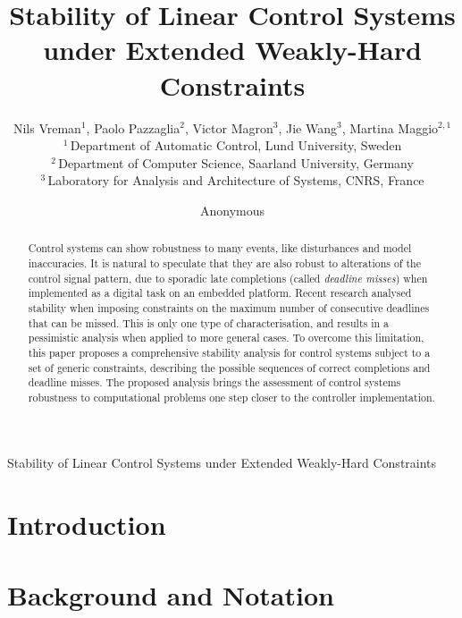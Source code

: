 \documentclass[lettersize,journal]{IEEEtran}
\begin{document}
\title{Stability of Linear Control Systems under Extended Weakly-Hard Constraints}

\author{Nils Vreman$^{1}$, Paolo Pazzaglia$^{2}$, Victor Magron$^{3}$, Jie Wang$^{3}$, Martina Maggio$^{2,1}$\\
$^{1}\,$Department of Automatic Control, Lund University, Sweden\\
$^{2}\,$Department of Computer Science, Saarland University, Germany\\
$^{3}\,$Laboratory for Analysis and Architecture of Systems, CNRS, France}
\author{Anonymous}

%
{Stability of Linear Control Systems under Extended Weakly-Hard Constraints}

\maketitle

\begin{abstract}
Control systems can show robustness to many events, like disturbances and model inaccuracies.
It is natural to speculate that they are also robust to alterations of the control signal pattern, due to sporadic late completions (called \emph{deadline misses}) when implemented as a digital task on an embedded platform.
Recent research analysed stability when imposing constraints on the maximum number of consecutive deadlines that can be missed.
This is only one type of characterisation, and results in a pessimistic analysis when applied to more general cases.
To overcome this limitation, this paper proposes a comprehensive stability analysis for control systems subject to a set of generic constraints, describing the possible sequences  of correct completions and deadline misses.
The proposed analysis brings the assessment of control systems robustness to computational problems one step closer to the controller implementation.
\end{abstract}

\section{Introduction}
\label{sec:intro}


\section{Background and Notation}
\label{sec:background}

\end{document}
